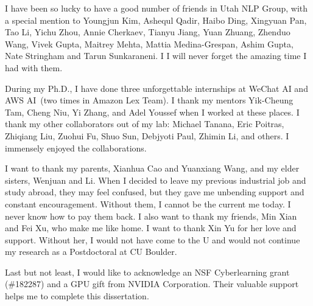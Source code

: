 I have been so lucky to have a good number of friends in Utah NLP
Group, with a special mention to Youngjun Kim, Ashequl Qadir, Haibo
Ding, Xingyuan Pan, Tao Li, Yichu Zhou, Annie Cherkaev, Tianyu Jiang,
Yuan Zhuang, Zhenduo Wang, Vivek Gupta, Maitrey Mehta, Mattia
Medina-Grespan, Ashim Gupta, Nate Stringham and Tarun Sunkaraneni. I
I will never forget the amazing time I had with them.

During my Ph.D., I have done three unforgettable internships at WeChat
AI and AWS AI~(two times in Amazon Lex Team). I thank my mentors
Yik-Cheung Tam, Cheng Niu, Yi Zhang, and Adel Youssef when I worked at
these places. I thank my other collaborators out of my lab: Michael
Tanana, Eric Poitras, Zhiqiang Liu, Zuohui Fu, Shuo Sun, Debjyoti
Paul, Zhimin Li, and others. I immensely enjoyed the collaborations.


I want to thank my parents, Xianhua Cao and Yuanxiang Wang, and my
elder sisters, Wenjuan and Li. When I decided to leave my previous
industrial job and study abroad, they may feel confused, but they gave
me unbending support and constant encouragement. Without them, I
cannot be the current me today. I never know how to pay them back. I
also want to thank my friends, Min Xian and Fei Xu, who make me like
home. I want to thank Xin Yu for her love and support. Without her, I
would not have come to the U and would not continue my research as a
Postdoctoral at CU Boulder.

Last but not least, I would like to acknowledge an NSF Cyberlearning
grant (\#182287) and a GPU gift from NVIDIA Corporation. Their
valuable support helps me to complete this dissertation.

